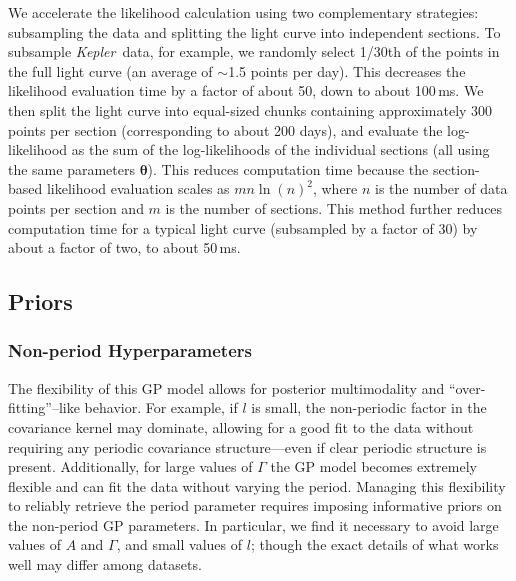 \documentclass[a4paper,fleqn,usenatbib,useAMS]{mnras}
\newcommand{\Kepler}{{\it Kepler}}
\begin{document}
We accelerate the likelihood calculation using two complementary strategies:
subsampling the data and splitting the light curve into independent sections.
To subsample \Kepler\ data, for example,
we randomly select 1/30th of the points
in the full light curve (an average of $\sim$1.5 points per day).
This decreases the likelihood evaluation time by a factor of about 50, down to
about 100\,ms.
We then split the light curve into equal-sized chunks containing approximately
300 points per section (corresponding to about 200 days), and evaluate the
log-likelihood as the sum of the log-likelihoods of the individual sections
(all using the same parameters ${\bm \theta}$).
This reduces computation time because the section-based likelihood evaluation
scales as $mn\ln(n)^2$, where $n$ is the number of data points per section and
$m$ is the number of sections.
This method further reduces computation time for a typical light curve
(subsampled by a factor of 30) by about a factor of two, to about 50\,ms.

\subsection{Priors}
\label{sec:GP_prior}

\subsubsection{Non-period Hyperparameters}
\label{sec:nonperiod_prior}

The flexibility of this GP model allows for posterior multimodality and
``over-fitting''--like behavior.
For example, if $l$ is small, the non-periodic factor in the covariance
kernel may dominate, allowing for a good fit to the data without
requiring any periodic covariance structure---even if clear periodic
structure is present.
Additionally, for large values of $\Gamma$ the GP model becomes extremely
flexible and can fit the data without varying the period.
Managing this flexibility to reliably retrieve the period parameter requires
imposing informative priors on the non-period GP parameters.
In particular, we find it necessary to avoid large values of
$A$ and $\Gamma$, and small values of $l$; though the exact details of what
works well may differ among datasets.
\end{document}
